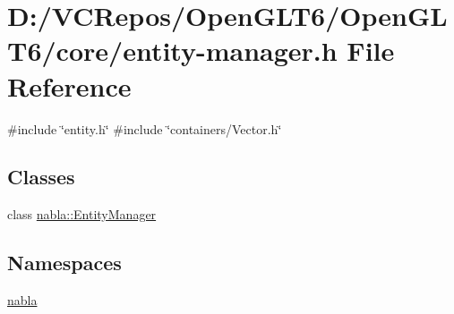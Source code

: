 \hypertarget{entity-manager_8h}{}\section{D\+:/\+V\+C\+Repos/\+Open\+G\+L\+T6/\+Open\+G\+L\+T6/core/entity-\/manager.h File Reference}
\label{entity-manager_8h}
{\ttfamily \#include \char`\"{}entity.\+h\char`\"{}}\newline
{\ttfamily \#include \char`\"{}containers/\+Vector.\+h\char`\"{}}\newline
\subsection*{Classes}
\begin{DoxyCompactItemize}
\item 
class \mbox{\hyperlink{classnabla_1_1_entity_manager}{nabla\+::\+Entity\+Manager}}
\end{DoxyCompactItemize}
\subsection*{Namespaces}
\begin{DoxyCompactItemize}
\item 
 \mbox{\hyperlink{namespacenabla}{nabla}}
\end{DoxyCompactItemize}

